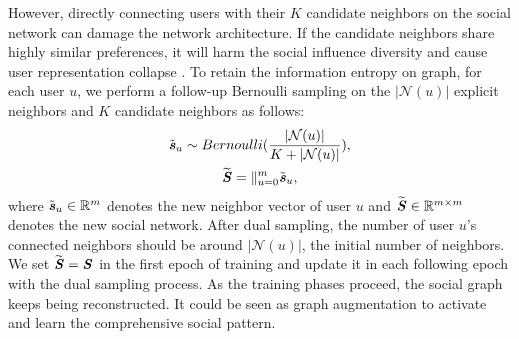 \documentclass[letterpaper]{article} %
\begin{document}
However, directly connecting users with their $K$ candidate neighbors on the social network can damage the network architecture. If the candidate neighbors share highly similar preferences, it will harm the social influence diversity and cause user representation collapse \cite{collapse}. To retain the information entropy on graph, for each user $u$, we perform a follow-up Bernoulli sampling on the $|{\mathcal{N}}(u)|$ explicit neighbors and $K$ candidate neighbors as follows:
\begin{gather}
    \tilde{\textbf{\textit{s}}}_u \sim Bernoulli(\frac{|\mathcal{N}(u)|}{K+|\mathcal{N}(u)|}),\\
    \widetilde{\textbf{\textit{S}}} = \mathbin\Vert_{u=0}^{m}\tilde{\textbf{\textit{s}}}_u,
\end{gather}
where $\tilde{\textbf{\textit{s}}}_u \in \mathbb{R}^{m}$ denotes the new neighbor vector of user $u$ and  $\widetilde{\textbf{\textit{S}}} \in \mathbb{R}^{m\times m}$ denotes the new social network. After dual sampling, the number of user $u$'s connected neighbors should be around $|\mathcal{N}(u)|$, the initial number of neighbors. We set $\widetilde{\textbf{\textit{S}}}=\textbf{\textit{S}}$ in the first epoch of training and update it in each following epoch with the dual sampling process. As the training phases proceed, the social graph keeps being reconstructed. It could be seen as graph augmentation to activate and learn the comprehensive social pattern. 
\end{document}
